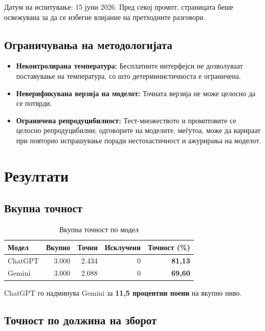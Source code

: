 \documentclass[12pt,a4paper]{article}
\theoremstyle{definition}
\begin{document}
Датум на испитување: 15 јуни 2026. Пред секој промпт, страницата беше освежувана за да се избегне влијание на претходните разговори.

\subsection{Ограничувања на методологијата}

\begin{itemize}
  \item \textbf{Неконтролирана температура:} Бесплатните интерфејси не дозволуваат поставување на температура, со што детерминистичноста е ограничена.
  \item \textbf{Неверификувана верзија на моделот:} Точната верзија не може целосно да се потврди.
  \item \textbf{Ограничена репродуцибилност:} Тест-множеството и промптовите се целосно репродуцибилни; одговорите на моделите, меѓутоа, може да варираат при повторно испрашување поради нестохастичност и ажурирања на моделот.
\end{itemize}

\section{Резултати}

\subsection{Вкупна точност}

\begin{table}[H]
\centering
\begin{tabular}{lrrrr}
\toprule
\textbf{Модел} & \textbf{Вкупно} & \textbf{Точни} & \textbf{Исклучени} & \textbf{Точност (\%)} \\
\midrule
ChatGPT & 3.000 & 2.434 & 0 & \textbf{81,13} \\
Gemini  & 3.000 & 2.088 & 0 & \textbf{69,60} \\
\bottomrule
\end{tabular}
\caption{Вкупна точност по модел}
\end{table}

ChatGPT го надминува Gemini за \textbf{11,5 процентни поени} на вкупно ниво.

\subsection{Точност по должина на зборот}
\end{document}
